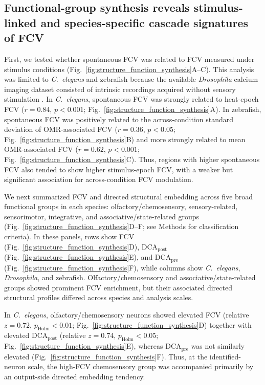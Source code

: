 \documentclass[9pt,twocolumn,twoside]{pnas-new}
\begin{document}
\subsection*{Functional-group synthesis reveals stimulus-linked and species-specific cascade signatures of FCV}

First, we tested whether spontaneous FCV was related to FCV measured under stimulus conditions (Fig.~\ref{fig:structure_function_synthesis}A--C). This analysis was limited to \textit{C.~elegans} and zebrafish because the available \textit{Drosophila} calcium imaging dataset consisted of intrinsic recordings acquired without sensory stimulation \citep{Turner2021Branson999}. In \textit{C.~elegans}, spontaneous FCV was strongly related to heat-epoch FCV ($r = 0.84$, $p < 0.001$; Fig.~\ref{fig:structure_function_synthesis}A). In zebrafish, spontaneous FCV was positively related to the across-condition standard deviation of OMR-associated FCV ($r = 0.36$, $p < 0.05$; Fig.~\ref{fig:structure_function_synthesis}B) and more strongly related to mean OMR-associated FCV ($r = 0.62$, $p < 0.001$; Fig.~\ref{fig:structure_function_synthesis}C). Thus, regions with higher spontaneous FCV also tended to show higher stimulus-epoch FCV, with a weaker but significant association for across-condition FCV modulation.


We next summarized FCV and directed structural embedding across five broad functional groups in each species: olfactory/chemosensory, sensory-related, sensorimotor, integrative, and associative/state-related groups (Fig.~\ref{fig:structure_function_synthesis}D--F; see Methods for classification criteria). In these panels, rows show FCV (Fig.~\ref{fig:structure_function_synthesis}D), $\mathrm{DCA}_{\mathrm{post}}$ (Fig.~\ref{fig:structure_function_synthesis}E), and $\mathrm{DCA}_{\mathrm{pre}}$ (Fig.~\ref{fig:structure_function_synthesis}F), while columns show \textit{C.~elegans}, \textit{Drosophila}, and zebrafish. Olfactory/chemosensory and associative/state-related groups showed prominent FCV enrichment, but their associated directed structural profiles differed across species and analysis scales.

In \textit{C.~elegans}, olfactory/chemosensory neurons showed elevated FCV (relative $z=0.72$, $p_{\mathrm{Holm}} < 0.01$; Fig.~\ref{fig:structure_function_synthesis}D) together with elevated $\mathrm{DCA}_{\mathrm{post}}$ (relative $z=0.74$, $p_{\mathrm{Holm}} < 0.05$; Fig.~\ref{fig:structure_function_synthesis}E), whereas $\mathrm{DCA}_{\mathrm{pre}}$ was not similarly elevated (Fig.~\ref{fig:structure_function_synthesis}F). Thus, at the identified-neuron scale, the high-FCV chemosensory group was accompanied primarily by an output-side directed embedding tendency.
\end{document}
